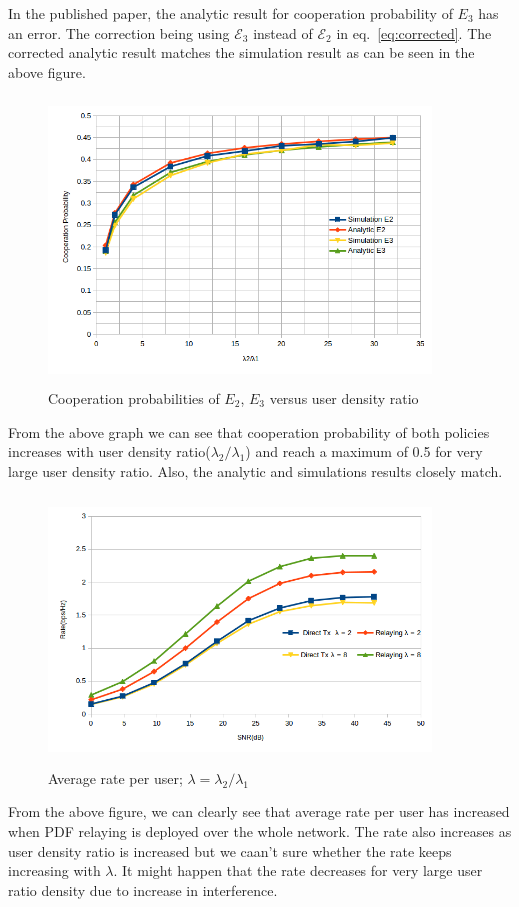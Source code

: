 In the published paper, the analytic result for cooperation probability of $E_3$ has an error. The correction being using $\mathcal{E}_3$ instead of $\mathcal{E}_2$ in eq.~\ref{eq:corrected}. The corrected analytic result matches the simulation result as can be seen in the above figure. 
\begin{figure}[H]
\begin{center}
\includegraphics[height = 3in,width=4in,angle=00]{images/coopP.png}
\caption{\small Cooperation probabilities of $E_2$, $E_3$ versus user density ratio}
\label{fig:cooP}
\end{center}
\end{figure}
From the above graph we can see that cooperation probability of both policies increases with user density ratio($\lambda_2/\lambda_1$) and reach a maximum of 0.5 for very large user density ratio. Also, the analytic and simulations results closely match. 

\begin{figure}[H]
\begin{center}
\includegraphics[height = 2.8in,width=4in,angle=00]{images/rates.png}
\caption{\small Average rate per user; $\lambda = \lambda_2/\lambda_1$}
\label{fig:rates}
\end{center}
\end{figure}
From the above figure, we can clearly see that average rate per user has increased when PDF relaying is deployed over the whole network. The rate also increases as user density ratio is increased but we caan't sure whether the rate keeps increasing with $\lambda$. It might happen that the rate decreases for very large user ratio density due to increase in interference.
